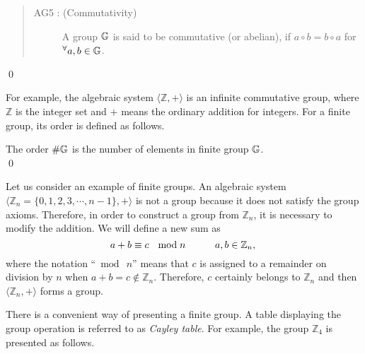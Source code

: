 \begin{definition}\hspace{0em}

\begin{quote}\begin{description}
\item[AG5 : (Commutativity)] A group $\mathbb{G}\index{group}$ is said to be commutative (or abelian), if $a\circ b=b\circ a$ for $^{\forall}a,b \in\mathbb{G}\index{group}$.
\end{description}\end{quote}
\qed
\end{definition}

For example, the algebraic system $\langle\mathbb{Z},+\rangle$ is an infinite commutative group, where $\mathbb Z$ is the integer set and $+$ means the ordinary addition for integers. For a finite group, its order is defined as follows.

\begin{definition}\hspace{0em}
The order $\#\mathbb{G}\index{group}$ is the number of elements in finite group $\mathbb{G}\index{group}$.
\\\qed
\end{definition}

Let us consider an example of finite groups. An algebraic system $\langle\mathbb{Z}_{n}=\{0,1,2,3,\cdots,n-1\},+\rangle$ is not a group because it does not satisfy the group axioms. Therefore, in order to construct a group from $\mathbb{Z}_n$, it is necessary to modify the addition. We will define a new sum as
\begin{equation}
a+b\equiv c\ \ \bmod n\hspace{3em}a,b\in \mathbb{Z}_{n},\label{Sum Definition}\\
\end{equation}
where the notation ``$\bmod\ n$'' means that $c$ is assigned to a remainder on division by $n$ when $a+b=c\notin\mathbb{Z}_{n}$. Therefore, $c$ certainly belongs to $\mathbb{Z}_{n}$ and then $\langle \mathbb{Z}_{n},+\rangle$ forms a group.

There is a convenient way of presenting a finite group. A table displaying the group operation is referred to as {\em Cayley table}. For example, the group $\mathbb{Z}_4$ is presented as follows.

